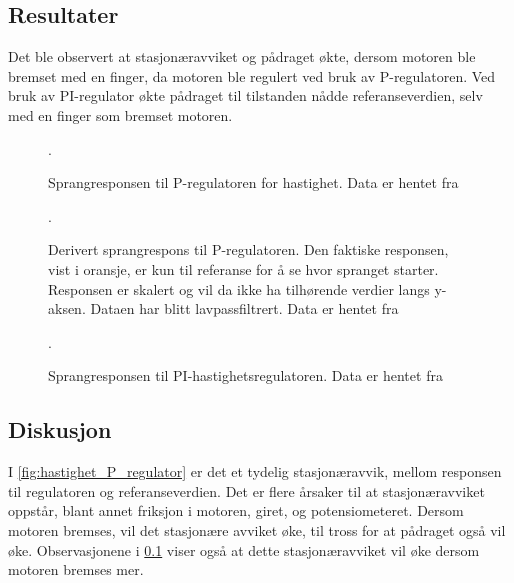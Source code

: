 \subsection{Resultater}

\label{obs:hastighet_regulator_breming_med_finger}
Det ble observert at stasjonæravviket og pådraget økte, dersom motoren ble bremset med en finger, da motoren ble regulert ved bruk av P-regulatoren. Ved bruk av PI-regulator økte pådraget til tilstanden nådde referanseverdien, selv med en finger som bremset motoren.

\begin{figure}[h]
    \centering
    
    \caption{Sprangresponsen til P-regulatoren for hastighet. Data er hentet fra \cite{EksempelData}}.
    \label{fig:hastighet_P_regulator}
\end{figure}

\begin{figure}[h]
    \centering
    
    \caption{
        Derivert sprangrespons til P-regulatoren.
        Den faktiske responsen, vist i oransje, er kun til referanse for å se hvor spranget starter. Responsen er skalert og vil da ikke ha tilhørende verdier langs y-aksen.
        Dataen har blitt lavpassfiltrert.
        Data er hentet fra \cite{EksempelData}
    }.
    \label{fig:hastighet_P_regulator_derivert}
\end{figure}

\begin{figure}[h]
    \centering
    
    \caption{Sprangresponsen til PI-hastighetsregulatoren. Data er hentet fra \cite{EksempelData}}.
    \label{fig:hastighet_PI_regulator}
\end{figure}






\subsection{Diskusjon}

I \autoref{fig:hastighet_P_regulator} er det et tydelig stasjonæravvik, mellom responsen til regulatoren og referanseverdien. Det er flere årsaker til at stasjonæravviket oppstår, blant annet friksjon i motoren, giret, og potensiometeret. Dersom motoren bremses, vil det stasjonære avviket øke, til tross for at pådraget også vil øke. Observasjonene i \ref{obs:hastighet_regulator_breming_med_finger} viser også at dette stasjonæravviket vil øke dersom motoren bremses mer.

